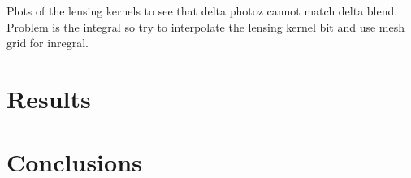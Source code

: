 \documentclass[prd,amsmath,aps,floats,amssymb, floatfix, superscriptaddress,nofootinbib,preprintnumbers,twocolumn]{article}  %
\begin{document}
Plots of the lensing kernels to see that delta photoz cannot match delta blend. Problem is the integral so try to interpolate the lensing kernel bit and use mesh grid for inregral. 





\section{Results}
\label{sec:results}

\section{Conclusions}
\label{sec:ccl}
\end{document}

